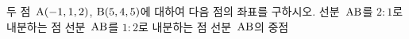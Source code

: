 두 점~$\mathrm{A}(-1{,}\mkern3mu\mathopen{}1{,}\mkern3mu\mathopen{}2)$, $\mathrm{B}(5{,}\mkern3mu\mathopen{}4{,}\mkern3mu\mathopen{}5)$에 대하여 다음 점의 좌표를 구하시오.
 선분~$\mathrm{AB}$를 $2:1$로 내분하는 점
 선분~$\mathrm{AB}$를 $1:2$로 내분하는 점
 선분~$\mathrm{AB}$의 중점
